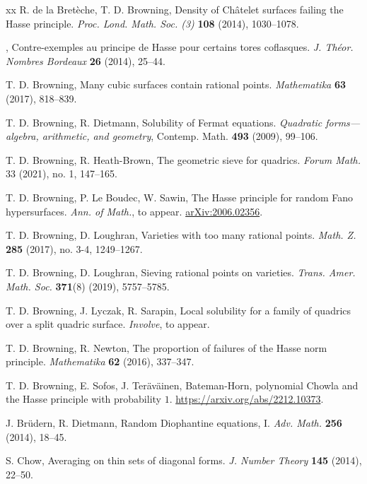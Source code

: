 \documentclass[a4paper,12pt,reqno]{amsart}
\numberwithin{equation}{section} \numberwithin{figure}{section}
\renewcommand{\#}{\sharp}
\theoremstyle{definition}
\numberwithin{lemma}{section}
\begin{document}
\begin{thebibliography}{xx}
{R. de la Bret\`eche, T. D. Browning},
{Density of {C}h\^{a}telet surfaces failing the {H}asse principle}.
\emph{Proc. Lond. Math. Soc. (3)} {\bf 108} (2014), 1030--1078.

{\bysame},
{Contre-exemples au principe de {H}asse pour certains tores
              coflasques}.
\emph{J. Th\'{e}or. Nombres Bordeaux} {\bf 26} (2014), 25--44.

{T. D. Browning},
{Many cubic surfaces contain rational points}.
\emph{Mathematika} {\bf 63} (2017), 818--839.

{T. D. Browning, R. Dietmann}, 
{Solubility of {F}ermat equations}.
\textit{Quadratic forms---algebra, arithmetic, and geometry}, Contemp. Math. \textbf{493} (2009), 99--106.


T. D. Browning, R. Heath-Brown, 
The geometric sieve for quadrics. 
\emph{Forum Math.} 33 (2021), no. 1, 147--165. 


{T. D. Browning, P. Le Boudec, W. Sawin},
{The Hasse principle for random Fano hypersurfaces}.
\emph{Ann. of Math.}, to appear.
\url{arXiv:2006.02356}.

{T. D. Browning, D. Loughran}, 
{Varieties with too many rational points}.
\emph{Math. Z.} {\bf285} (2017), no. 3-4, 1249--1267.

{T. D. Browning, D. Loughran}, 
{Sieving rational points on varieties}.
\emph{Trans. Amer. Math. Soc.} {\bf371}(8) (2019), 5757--5785.

{T. D. Browning, J. Lyczak, R. Sarapin},
Local solubility for a family of quadrics over a split quadric surface.
\emph{Involve}, to appear.



{T. D. Browning, R. Newton}, {The proportion of failures of the Hasse norm principle}. \emph{Mathematika} {\bf 62} (2016), 337--347.

{T. D. Browning, E. Sofos, J. Ter\"av\"ainen},
{Bateman-Horn, polynomial Chowla and the Hasse principle with probability {$1$}}.
\url{https://arxiv.org/abs/2212.10373}.



   {J. Br\"{u}dern, R. Dietmann}, {Random {D}iophantine equations, {I}}. \emph{Adv. Math.} {\bf 256} (2014), 18--45.

 {S. Chow}, {Averaging on thin sets of diagonal forms}. \emph{J. Number Theory} {\bf 145} (2014), 22--50.
 

\end{thebibliography}
\end{document}
